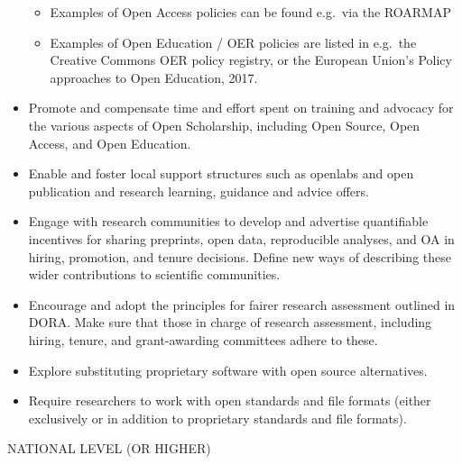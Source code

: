 \documentclass[]{article}
\providecommand{\tightlist}{%
  \setlength{\itemsep}{0pt}\setlength{\parskip}{0pt}}
\begin{document}
\begin{itemize}
  \begin{itemize}
  \tightlist
  \item
    Examples of Open Access policies can be found e.g.~via the ROARMAP
  \item
    Examples of Open Education / OER policies are listed in e.g.~the
    Creative Commons OER policy registry, or the European Union's Policy
    approaches to Open Education, 2017.
  \end{itemize}
\item
  Promote and compensate time and effort spent on training and advocacy
  for the various aspects of Open Scholarship, including Open Source,
  Open Access, and Open Education.
\item
  Enable and foster local support structures such as openlabs and open
  publication and research learning, guidance and advice offers.
\item
  Engage with research communities to develop and advertise quantifiable
  incentives for sharing preprints, open data, reproducible analyses,
  and OA in hiring, promotion, and tenure decisions. Define new ways of
  describing these wider contributions to scientific communities.
\item
  Encourage and adopt the principles for fairer research assessment
  outlined in DORA. Make sure that those in charge of research
  assessment, including hiring, tenure, and grant-awarding committees
  adhere to these.
\item
  Explore substituting proprietary software with open source
  alternatives.
\item
  Require researchers to work with open standards and file formats
  (either exclusively or in addition to proprietary standards and file
  formats).
\end{itemize}

NATIONAL LEVEL (OR HIGHER)
\end{document}
